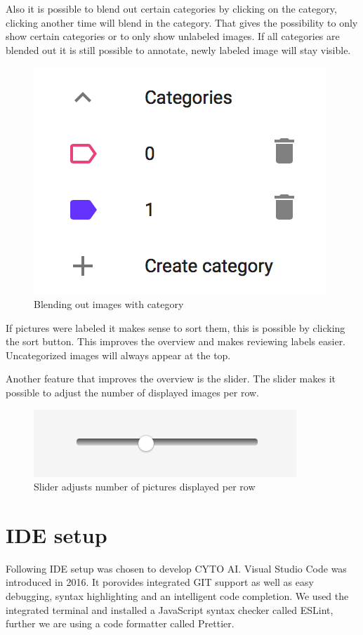 Also it is possible to blend out certain categories by
clicking on the category, clicking another time will blend
in the category. That gives the possibility to only show
certain categories or to only show unlabeled images.
If all categories are blended out it is still possible to
annotate, newly labeled image will stay visible.
 
\begin{figure}[H]
 	\centering
 	\includegraphics[scale=0.8]{bilder/cyto/BlendedOut.png}
 	\caption{Blending out images with category}
 	\label{fig:BlendingOut}
\end{figure}
  
If pictures were labeled it makes sense to sort them, this
is possible by clicking the sort button. This improves the
overview and makes reviewing labels easier. Uncategorized
images will always appear at the top.
 
Another feature that improves the overview is the slider. The slider makes it possible to adjust the number of displayed images per row. 

\begin{figure}[H]
	\centering
	\includegraphics[scale=0.8]{bilder/cyto/Slider.png}
	\caption{Slider adjusts number of pictures displayed per row}
	\label{fig:Slider}
\end{figure}

\section{IDE setup}
Following IDE setup was chosen to develop CYTO AI.
Visual Studio Code was introduced in 2016. It porovides integrated GIT support as well as easy debugging, syntax highlighting and an intelligent code completion.
We used the integrated terminal and installed a JavaScript syntax checker called ESLint, further we are using a code formatter called Prettier. 

